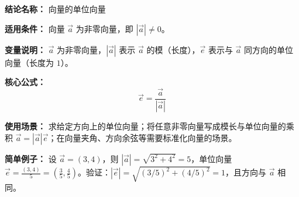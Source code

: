 \textbf{结论名称：} 向量的单位向量

\textbf{适用条件：} 向量 $\vec{a}$ 为非零向量，即 $|\vec{a}| \neq 0$。

\textbf{变量说明：} $\vec{a}$ 为非零向量，$|\vec{a}|$ 表示 $\vec{a}$ 的模（长度），$\vec{e}$ 表示与 $\vec{a}$ 同方向的单位向量（长度为 $1$）。

\textbf{核心公式：} \[ \boxed{\vec{e} = \frac{\vec{a}}{|\vec{a}|}} \]

\textbf{使用场景：} 求给定方向上的单位向量；将任意非零向量写成模长与单位向量的乘积 $\vec{a}=|\vec{a}|\vec{e}$；在向量夹角、方向余弦等需要标准化向量的场景。

\textbf{简单例子：} 设 $\vec{a}=(3,4)$，则 $|\vec{a}|=\sqrt{3^2+4^2}=5$，单位向量 $\vec{e} = \frac{(3,4)}{5} = \left(\frac{3}{5},\frac{4}{5}\right)$。验证：$|\vec{e}|=\sqrt{(3/5)^2+(4/5)^2}=1$，且方向与 $\vec{a}$ 相同。
